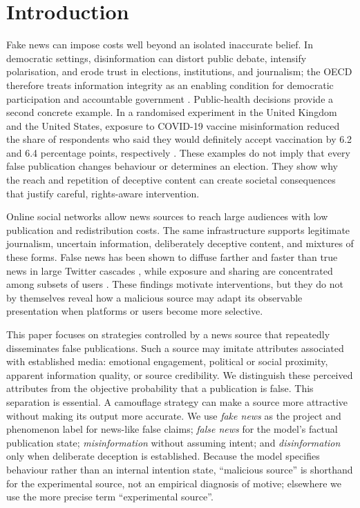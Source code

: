 \section{Introduction}

Fake news can impose costs well beyond an isolated inaccurate belief. In democratic settings, disinformation can distort public debate, intensify polarisation, and erode trust in elections, institutions, and journalism; the OECD therefore treats information integrity as an enabling condition for democratic participation and accountable government \citep{oecd2024}. Public-health decisions provide a second concrete example. In a randomised experiment in the United Kingdom and the United States, exposure to COVID-19 vaccine misinformation reduced the share of respondents who said they would definitely accept vaccination by 6.2 and 6.4 percentage points, respectively \citep{loomba2021}. These examples do not imply that every false publication changes behaviour or determines an election. They show why the reach and repetition of deceptive content can create societal consequences that justify careful, rights-aware intervention.

Online social networks allow news sources to reach large audiences with low publication and redistribution costs. The same infrastructure supports legitimate journalism, uncertain information, deliberately deceptive content, and mixtures of these forms. False news has been shown to diffuse farther and faster than true news in large Twitter cascades \citep{vosoughi2018}, while exposure and sharing are concentrated among subsets of users \citep{grinberg2019,guess2019}. These findings motivate interventions, but they do not by themselves reveal how a malicious source may adapt its observable presentation when platforms or users become more selective.

This paper focuses on strategies controlled by a news source that repeatedly disseminates false publications. Such a source may imitate attributes associated with established media: emotional engagement, political or social proximity, apparent information quality, or source credibility. We distinguish these perceived attributes from the objective probability that a publication is false. This separation is essential. A camouflage strategy can make a source more attractive without making its output more accurate. We use \textit{fake news} as the project and phenomenon label for news-like false claims; \textit{false news} for the model's factual publication state; \textit{misinformation} without assuming intent; and \textit{disinformation} only when deliberate deception is established. Because the model specifies behaviour rather than an internal intention state, ``malicious source'' is shorthand for the experimental source, not an empirical diagnosis of motive; elsewhere we use the more precise term ``experimental source''.

